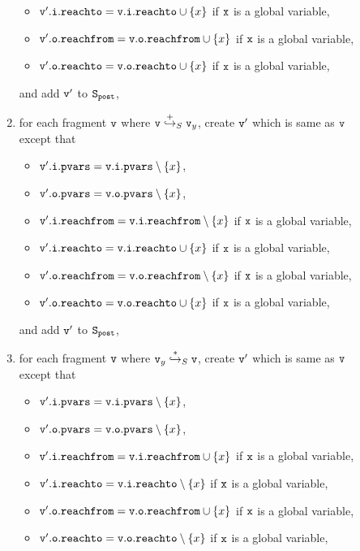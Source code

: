 \begin{description}
\begin{enumerate}
\begin{itemize}
\item $\mathtt{v}'.\mathtt{i}.\mathtt{reachto} = \mathtt{v}.\mathtt{i}.\mathtt{reachto} \cup \left\{x\right\}$ if $\tt x$ is a global variable,
 \item $\mathtt{v}'.\mathtt{o}.\mathtt{reachfrom} = \mathtt{v}.\mathtt{o}.\mathtt{reachfrom} \cup \left\{x\right\}$ if $\tt x$ is a global variable,
\item $\mathtt{v}'.\mathtt{o}.\mathtt{reachto} = \mathtt{v}.\mathtt{o}.\mathtt{reachto} \cup \left\{x\right\}$ if $\tt x$ is a global variable,
\end{itemize}
and add $\mathtt{v}'$ to $\tt S_{post}$,
\item for each fragment $\mathtt{v}$ where $\mathtt{v} \overset{+}\hookrightarrow_S \mathtt{v}_y$, create $\mathtt{v}'$ which is same as $\mathtt{v}$ except that
\begin{itemize}
\item $\mathtt{v}'.\mathtt{i}.\mathtt{pvars} = \mathtt{v}.\mathtt{i}.\mathtt{pvars} \setminus \left\{x\right\}$,
\item $\mathtt{v}'.\mathtt{o}.\mathtt{pvars} = \mathtt{v}.\mathtt{o}.\mathtt{pvars} \setminus \left\{x\right\}$,
\item $\mathtt{v}'.\mathtt{i}.\mathtt{reachfrom} = \mathtt{v}.\mathtt{i}.\mathtt{reachfrom} \setminus \left\{x\right\}$ if $\tt x$ is a global variable,
\item $\mathtt{v}'.\mathtt{i}.\mathtt{reachto} = \mathtt{v}.\mathtt{i}.\mathtt{reachto} \cup \left\{x\right\}$ if $\tt x$ is a global variable,
\item $\mathtt{v}'.\mathtt{o}.\mathtt{reachfrom} = \mathtt{v}.\mathtt{o}.\mathtt{reachfrom} \setminus \left\{x\right\}$ if $\tt x$ is a global variable,
\item $\mathtt{v}'.\mathtt{o}.\mathtt{reachto} = \mathtt{v}.\mathtt{o}.\mathtt{reachto} \cup \left\{x\right\}$ if $\tt x$ is a global variable,
\end{itemize}
and add $\mathtt{v}'$ to $\tt S_{post}$,
\item for each fragment $\mathtt{v}$ where $\mathtt{v}_y \overset{*}\hookrightarrow_S \mathtt{v}$, create $\mathtt{v}'$ which is same as $\mathtt{v}$ except that
\begin{itemize}
\item $\mathtt{v}'.\mathtt{i}.\mathtt{pvars} = \mathtt{v}.\mathtt{i}.\mathtt{pvars} \setminus \left\{x\right\}$,
\item $\mathtt{v}'.\mathtt{o}.\mathtt{pvars} = \mathtt{v}.\mathtt{o}.\mathtt{pvars} \setminus \left\{x\right\}$,
\item $\mathtt{v}'.\mathtt{i}.\mathtt{reachfrom} = \mathtt{v}.\mathtt{i}.\mathtt{reachfrom} \cup \left\{x\right\}$ if $\tt x$ is a global variable,
\item $\mathtt{v}'.\mathtt{i}.\mathtt{reachto} = \mathtt{v}.\mathtt{i}.\mathtt{reachto} \setminus \left\{x\right\}$ if $\tt x$ is a global variable,

 \item $\mathtt{v}'.\mathtt{o}.\mathtt{reachfrom} = \mathtt{v}.\mathtt{o}.\mathtt{reachfrom} \cup \left\{x\right\}$ if $\tt x$ is a global variable,
 \item $\mathtt{v}'.\mathtt{o}.\mathtt{reachto} = \mathtt{v}.\mathtt{o}.\mathtt{reachto} \setminus \left\{x\right\}$ if $\tt x$ is a global variable,


\end{itemize}
\end{enumerate}
\end{description}
